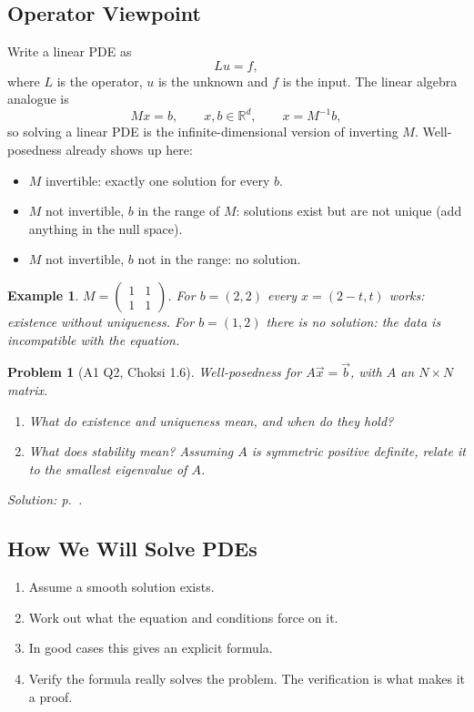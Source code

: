 \documentclass{article}
\newtheorem{problem}{Problem}
\newtheorem*{example}{Example}
\begin{document}
\subsection{Operator Viewpoint}
Write a linear PDE as
\begin{equation}
    Lu = f,
\end{equation}
where $L$ is the operator, $u$ is the unknown and $f$ is the input. The linear algebra analogue is
\begin{equation}
    Mx = b, \qquad x, b \in \mathbb{R}^d, \qquad x = M^{-1}b,
\end{equation}
so solving a linear PDE is the infinite-dimensional version of inverting $M$. Well-posedness already shows up here:
\begin{itemize}
    \item $M$ invertible: exactly one solution for every $b$.
    \item $M$ not invertible, $b$ in the range of $M$: solutions exist but are not unique (add anything in the null space).
    \item $M$ not invertible, $b$ not in the range: no solution.
\end{itemize}
\begin{example}
    $M = \begin{pmatrix} 1 & 1 \\ 1 & 1 \end{pmatrix}$. For $b = (2,2)$ every $x = (2-t, t)$ works: existence without uniqueness. For $b = (1,2)$ there is no solution: the data is incompatible with the equation.
\end{example}

\begin{problem}[A1 Q2, Choksi 1.6]\label{prob:a1-16}
    Well-posedness for $A\vec{x} = \vec{b}$, with $A$ an $N\times N$ matrix.
    \begin{enumerate}[label=(\alph*)]
        \item What do existence and uniqueness mean, and when do they hold?
        \item What does stability mean? Assuming $A$ is symmetric positive definite, relate it to the smallest eigenvalue of $A$.
    \end{enumerate}
    \hfill \emph{Solution: p.~\pageref{sol:a1-16}.}
\end{problem}

\subsection{How We Will Solve PDEs}
\begin{enumerate}[label=(\arabic*)]
    \item Assume a smooth solution exists.
    \item Work out what the equation and conditions force on it.
    \item In good cases this gives an explicit formula.
    \item Verify the formula really solves the problem. The verification is what makes it a proof.
\end{enumerate}
\end{document}
